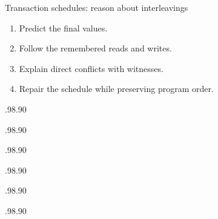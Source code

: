 \documentclass[aspectratio=169]{beamer}
\begin{document}
\begin{frame}{Transaction schedules: reason about interleavings}
\begin{enumerate}
\item Predict the final values.
\item Follow the remembered reads and writes.
\item Explain direct conflicts with witnesses.
\item Repair the schedule while preserving program order.
\end{enumerate}
\end{frame}
\begin{frame}
\begin{transactionsschedule}[id=counter]{.98\linewidth}{.90\textheight}
\end{transactionsschedule}
\end{frame}
\begin{frame}
\begin{transactionsschedule}[id=independent]{.98\linewidth}{.90\textheight}
\end{transactionsschedule}
\end{frame}
\begin{frame}
\begin{transactionsschedule}[id=read_read]{.98\linewidth}{.90\textheight}
\end{transactionsschedule}
\end{frame}
\begin{frame}
\begin{transactionsschedule}[id=write_write]{.98\linewidth}{.90\textheight}
\end{transactionsschedule}
\end{frame}
\begin{frame}
\begin{transactionsschedule}[id=chain]{.98\linewidth}{.90\textheight}
\end{transactionsschedule}
\end{frame}
\begin{frame}
\begin{transactionsschedule}[id=blind_write]{.98\linewidth}{.90\textheight}
\end{transactionsschedule}
\end{frame}
\end{document}
